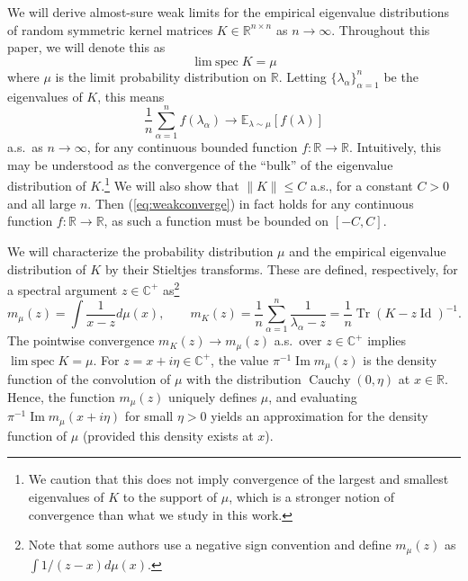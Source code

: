 \documentclass{article}
\theoremstyle{definition}
\newcommand{\R}{\mathbb{R}}
\newcommand{\C}{\mathbb{C}}
\newcommand{\E}{\mathbb{E}}
\newcommand{\Id}{\operatorname{Id}}
\newcommand{\Tr}{\operatorname{Tr}}
\renewcommand{\a}{\alpha}
\newcommand{\1}{\mathbf{1}}
\newcommand{\limspec}{\operatorname{lim\;spec}}
\renewcommand{\Im}{\operatorname{Im}}
\begin{document}
We will derive almost-sure weak limits for the empirical eigenvalue
distributions of random symmetric kernel matrices $K \in \R^{n \times n}$
as $n \to \infty$. Throughout this paper, we will denote this as
\[\limspec K=\mu\]
where $\mu$ is the limit probability distribution on $\R$.
Letting $\{\lambda_\a\}_{\a=1}^n$ be the eigenvalues of $K$, this means
\begin{equation}\label{eq:weakconverge}
\frac{1}{n}\sum_{\a=1}^n f(\lambda_\a) \to \E_{\lambda \sim \mu} [f(\lambda)]
\end{equation}
a.s.\ as $n \to \infty$, for any continuous bounded
function $f:\R \to \R$.
Intuitively, this may be understood as the convergence
of the ``bulk'' of the eigenvalue distribution
of $K$.\footnote{We caution that this does not imply convergence of the
largest and smallest eigenvalues of $K$ to the support of $\mu$, which is a
stronger notion of convergence than what we study in this work.}
We will also show that $\|K\| \leq C$ a.s., for a constant $C>0$ and all large
$n$. Then (\ref{eq:weakconverge}) in fact holds for any continuous
function $f:\R \to \R$, as such a function must be bounded on $[-C,C]$.

We will characterize the probability distribution $\mu$ and the empirical
eigenvalue distribution of $K$ by their Stieltjes
transforms. These are defined, respectively, for a spectral
argument $z \in \C^+$ as\footnote{Note that some authors use a negative sign
convention and define $m_\mu(z)$ as $\int 1/(z-x)d\mu(x)$.}
\[m_\mu(z)=\int \frac{1}{x-z}d\mu(x), \qquad
m_K(z)=\frac{1}{n}\sum_{\a=1}^n \frac{1}{\lambda_\a-z}
=\frac{1}{n}\Tr (K-z\Id)^{-1}.\]
The pointwise convergence $m_K(z) \to m_\mu(z)$ a.s.\ over $z \in \C^+$
implies $\limspec K=\mu$.
For $z=x+i\eta \in \C^+$, the value $\pi^{-1}\Im m_\mu(z)$ is
the density function of the convolution of $\mu$ with the distribution
$\operatorname{Cauchy}(0,\eta)$ at $x \in \R$. Hence, the function
$m_\mu(z)$ uniquely defines $\mu$, and evaluating $\pi^{-1}\Im m_\mu(x+i\eta)$
for small $\eta>0$ yields an approximation for the density function
of $\mu$ (provided this density exists at $x$).
\end{document}
